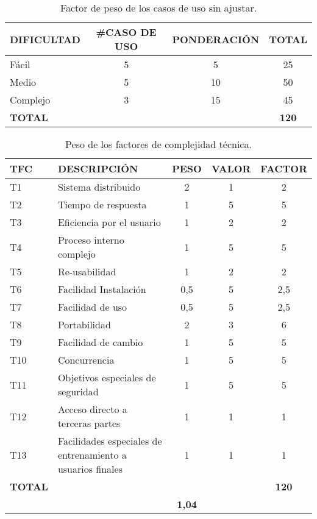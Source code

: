 \begin{table}[!hb]
\begin{center}
\begin{tabular}{l c c c}
\textbf{DIFICULTAD} & \textbf{\#CASO DE USO} & \textbf{PONDERACIÓN} & \textbf{TOTAL}\\ \hline \hline
Fácil & 5 & 5 & 25  \\
Medio & 5 & 10 & 50\\
Complejo & 3 & 15 & 45\\ \hline
\textbf{TOTAL} &  & & \textbf{120}\\ \hline \hline
\end{tabular}
\caption{Factor de peso de los casos de uso sin ajustar.}
\label{tab:ucw}
\end{center}
\end{table}


\begin{table}[!hb]
\begin{center}
\begin{tabular}{l l c c c}
\textbf{TFC} & \textbf{DESCRIPCIÓN} & \textbf{PESO} & \textbf{VALOR} & \textbf{FACTOR}\\ \hline \hline
T1	&	Sistema distribuido	&	2	&	1	&	2	\\
T2	&	Tiempo de respuesta	&	1	&	5	&	5	\\
T3	&	Eficiencia por el usuario	&	1	&	2	&	2	\\
T4	&	Proceso interno complejo	&	1	&	5	&	5	\\
T5	&	Re-usabilidad	&	1	&	2	&	2	\\
T6	&	Facilidad Instalación	&	0,5	&	5	&	2,5	\\
T7	&	Facilidad de uso	&	0,5	&	5	&	2,5	\\
T8	&	Portabilidad	&	2	&	3	&	6	\\
T9	&	Facilidad de cambio	&	1	&	5	&	5	\\
T10	&	Concurrencia	&	1	&	5	&	5	\\
T11	&	Objetivos especiales de seguridad	&	1	&	5	&	5	\\
T12	&	Acceso directo a terceras partes	&	1	&	1	&	1	\\
T13	&	Facilidades especiales de entrenamiento a usuarios finales	&	1	&	1	&	1	\\ \hline
\textbf{TOTAL} & & & & \textbf{120}\\ \hline \hline
\multicolumn{2}{l}{}\textbf{Factores técnicos} & \textbf{1,04} & & \\ \hline \hline
\end{tabular}
\caption{Peso de los factores de complejidad técnica.}
\label{tab:tcf}
\end{center}
\end{table}

